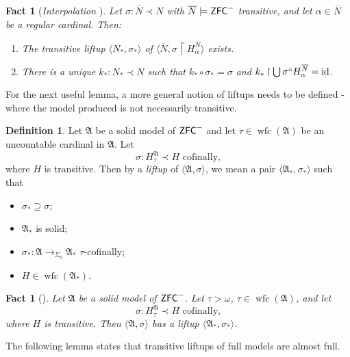 \documentclass{amsart}
\newtheorem{fact}[theorem]{Fact}
\theoremstyle{definition}
\newtheorem{definition}[theorem]{Definition}
\theoremstyle{remark}
\newcommand{\N}{{\overline{N}}}
\newcommand{\ZFC}{\textup{\ensuremath{\textsf{ZFC}}}}
\newcommand{\id}{\textup{\ensuremath{\text{id}}}}
\DeclareMathOperator{\wfc}{wfc}
\newcommand{\To}{\longrightarrow}
\newcommand{\rest}{\mathbin{\upharpoonright}}
\begin{document}
\begin{fact}[\emph{Interpolation} {\cite[Lemma 5.1]{Jensen:2014}}]\label{fact:Interpolation} Let $\sigma:\N \prec N$ with $\N \models \ZFC^-$ transitive, and let $\alpha \in \N$ be a regular cardinal. Then: \begin{enumerate}
	\item The transitive liftup $\langle N_*, \sigma_* \rangle$ of $\langle \N, \sigma \rest H^{\N}_\alpha \rangle$ exists.
	\item There is a unique $k_*:N_* \prec N$ such that $k_* \circ \sigma_* = \sigma$ and $k_* \rest \bigcup \sigma `` H^{\N}_\alpha = \id$.
\end{enumerate}
\end{fact} 

For the next useful lemma, a more general notion of liftups needs to be defined - where the model produced is not necessarily transitive.
\begin{definition} Let $\mathfrak A$ be a solid model of $\ZFC^-$ and let $\tau \in \wfc(\mathfrak A)$ be an uncountable cardinal in $\mathfrak A$. Let $$\sigma: H_{\tau}^\mathfrak A \prec H \text{ cofinally,}$$ where $H$ is transitive. Then by a \textit{liftup} of $\langle \mathfrak A, \sigma\rangle$, we mean a pair $\langle {\mathfrak A}_*, \sigma_* \rangle$ such that 
\begin{itemize}
	\item $\sigma_* \supseteq \sigma$;
	\item ${\mathfrak A}_*$ is solid;
	\item $\sigma_*: \mathfrak A \To_{\Sigma_0} {\mathfrak A}_*$ $\tau$-cofinally;
	\item $H \in \wfc({\mathfrak A}_*)$. \qedhere
\end{itemize}
\end{definition}
\begin{fact}[{\cite[Lemma 3.3]{Jensen:2014}}]\label{fact:solidliftup} Let $\mathfrak A$ be a solid model of $\ZFC^-$. Let $\tau > \omega$, $\tau \in \wfc(\mathfrak A)$, and let $$\sigma: H_{\tau}^{\mathfrak A} \prec H \text{ cofinally,}$$  where $H$ is transitive. Then $\langle \mathfrak A, \sigma \rangle$ has a liftup $\langle \mathfrak A_*, \sigma_* \rangle$.
\end{fact}

The following lemma states that transitive liftups of full models are almost full.
\end{document}
